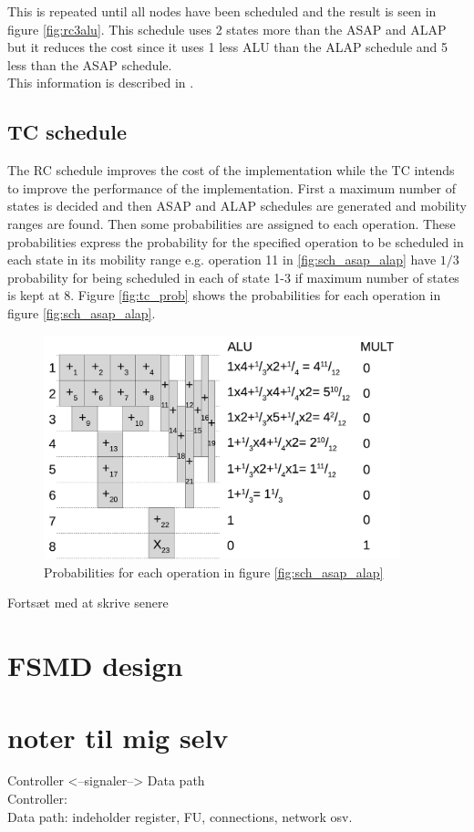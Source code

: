 This is repeated until all nodes have been scheduled and the result is seen in figure \vref{fig:rc3alu}. This schedule uses 2 states more than the ASAP and ALAP but it reduces the cost since it uses 1 less ALU than the ALAP schedule and 5 less than the ASAP schedule.  \\
This information is described in \cite{gajski2009}.

\subsection{TC schedule}
The RC schedule improves the cost of the implementation while the TC intends to improve the performance of the implementation. First a maximum number of states is decided and then ASAP and ALAP schedules are generated and mobility ranges are found. Then some probabilities are assigned to each operation. These probabilities express the probability for the specified operation to be scheduled in each state in its mobility range e.g. operation 11 in \vref{fig:sch_asap_alap} have $1/3$ probability for being scheduled in each of state 1-3 if maximum number of states is kept at 8. Figure \vref{fig:tc_prob} shows the probabilities for each operation in figure \vref{fig:sch_asap_alap}.
\begin{figure}[ht!]
  \centering
  \includegraphics[height=6.5cm]{figures/tcscheprob}
  \caption{Probabilities for each operation in figure \vref{fig:sch_asap_alap}}
  \label{fig:tc_prob}
\end{figure}
{\color{gray}Fortsæt med at skrive senere}


\section{FSMD design}
\color{gray}
\section*{noter til mig selv}
Controller <--signaler--> Data path\\
Controller:\\
Data path:  indeholder register, FU, connections, network osv.

